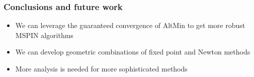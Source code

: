 \documentclass{beamer}
\begin{document}
\begin{frame}
\frametitle{Conclusions and future work}

\begin{itemize}
\item We can leverage the guaranteed convergence of AltMin to get more robust MSPIN algorithms
\item We can develop geometric combinations of fixed point and Newton methods
\item More analysis is needed for more sophisticated methods
\end{itemize}

\end{frame}
\end{document}
